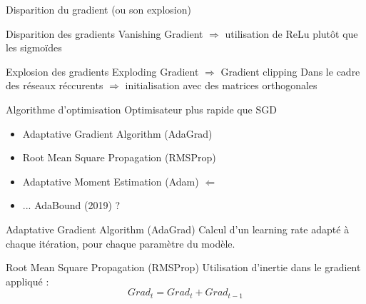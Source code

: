 \begin{frame}{Disparition du gradient (ou son explosion)}
\end{frame}

\begin{frame}{Disparition des gradients}
  Vanishing Gradient $\Rightarrow$ utilisation de ReLu plutôt que les sigmoïdes
  \vfill
\end{frame}

\begin{frame}{Explosion des gradients}
  Exploding Gradient $\Rightarrow$ Gradient clipping
  Dans le cadre des réseaux réccurents $\Rightarrow$ initialisation avec des matrices orthogonales
\end{frame}

\begin{frame}{Algorithme d'optimisation}
  Optimisateur plus rapide que SGD
  \begin{itemize}[<+(1)->]
    \item Adaptative Gradient Algorithm (AdaGrad)
    \item Root Mean Square Propagation (RMSProp)
    \item Adaptative Moment Estimation (Adam)    $\Leftarrow$
    \item ... AdaBound (2019) ?
  \end{itemize}
\end{frame}

\begin{frame}{Adaptative Gradient Algorithm (AdaGrad)}
  Calcul d'un learning rate adapté à chaque itération, pour chaque paramètre du modèle.
\end{frame}

\begin{frame}{Root Mean Square Propagation (RMSProp)}
  Utilisation d'inertie dans le gradient appliqué :
  $$
    Grad_t = Grad_t + Grad_{t-1}
  $$
\end{frame}
